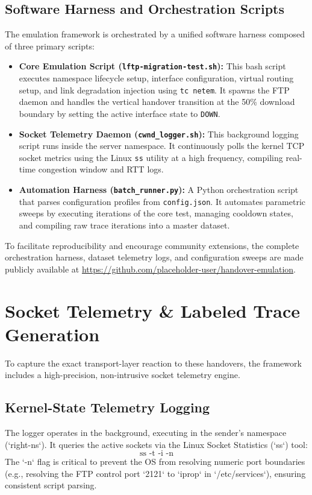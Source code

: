 \documentclass[conference]{IEEEtran}
\begin{document}
\subsection{Software Harness and Orchestration Scripts}
The emulation framework is orchestrated by a unified software harness composed of three primary scripts:
\begin{itemize}
    \item \textbf{Core Emulation Script (\texttt{lftp-migration-test.sh}):} This bash script executes namespace lifecycle setup, interface configuration, virtual routing setup, and link degradation injection using \texttt{tc netem}. It spawns the FTP daemon and handles the vertical handover transition at the 50\% download boundary by setting the active interface state to \texttt{DOWN}.
    \item \textbf{Socket Telemetry Daemon (\texttt{cwnd\_logger.sh}):} This background logging script runs inside the server namespace. It continuously polls the kernel TCP socket metrics using the Linux \texttt{ss} utility at a high frequency, compiling real-time congestion window and RTT logs.
    \item \textbf{Automation Harness (\texttt{batch\_runner.py}):} A Python orchestration script that parses configuration profiles from \texttt{config.json}. It automates parametric sweeps by executing iterations of the core test, managing cooldown states, and compiling raw trace iterations into a master dataset.
\end{itemize}
To facilitate reproducibility and encourage community extensions, the complete orchestration harness, dataset telemetry logs, and configuration sweeps are made publicly available at \url{https://github.com/placeholder-user/handover-emulation}.



\section{Socket Telemetry \& Labeled Trace Generation}
To capture the exact transport-layer reaction to these handovers, the framework includes a high-precision, non-intrusive socket telemetry engine.

\subsection{Kernel-State Telemetry Logging}
The logger operates in the background, executing in the sender's namespace (`right-ns`). It queries the active sockets via the Linux Socket Statistics (`ss`) tool:
\begin{equation}
    \text{ss -t -i -n}
\end{equation}
The `-n` flag is critical to prevent the OS from resolving numeric port boundaries (e.g., resolving the FTP control port `2121` to `iprop` in `/etc/services`), ensuring consistent script parsing.
\end{document}
